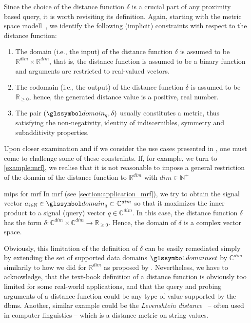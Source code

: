 Since the choice of the distance function $\delta$ is a crucial part of any proximity based query, it is worth revisiting its definition. Again, starting with the metric space modell~\cite{Zezula:2006Similarity}, we identify the following (implicit) constraints with respect to the distance function:

\begin{enumerate}
    \item The domain (i.e., the input) of the distance function $\delta$ is assumed to be $\mathbb{R}^{dim} \times \mathbb{R}^{dim}$, that is, the distance function is assumed to be a binary function and arguments are restricted to real-valued vectors.
    \item The codomain (i.e., the output) of the distance function $\delta$ is assumed to be $\mathbb{R}_{\geq 0}$, hence, the generated distance value is a positive, real number.
    \item The pair $(\domain_q,\delta)$ usually constitutes a metric, thus satisfying the non-negativity, identity of indiscernibles, symmetry and subadditivity properties.
\end{enumerate}

Upon closer examination and if we consider the use cases presented in , one must come to challenge some of these constraints. If, for example, we turn to \cref{example:mrf}, we realise that it is not reasonable to impose a general restriction of the domain of the distance function to $\mathbb{R}^{dim}$ with $dim \in \mathbb{N^{+}}$

\begin{example}[label=example:mrf]{\acrlong{mips}{} for \acrshort{mrf}}{}
    In \acrshort{mrf} (see \cref{section:application_mrf}), we try to obtain the signal vector $a_{i \in \mathbb{N}} \in \domain_q \subset \mathbb{C}^{dim}$ so that it maximizes the inner product to a signal (query) vector $q \in \mathbb{C}^{dim}$. In this case, the distance function $\delta$ has the form $\delta \colon \mathbb{C}^{dim} \times \mathbb{C}^{dim} \to \mathbb{R}_{\geq 0}$. Hence, the domain of $\delta$ is a complex vector space.
\end{example}

Obviously, this limitation of the definition of $\delta$ can be easily remediated simply by extending the set of supported data domains $\domainset$ by $\mathbb{C}^{dim}$ similarily to how we did for $\mathbb{R}^{dim}$ as proposed by \cite{Giangreco:2018Database}. Nevertheless, we have to acknowledge, that the text-book definition of a distance function is obviously too limited for some real-world applications, and that the query and probing arguments of a distance function could be any type of value supported by the \acrshort{dbms}. Another, similar example could be the \emph{Levenshtein distance}~\cite{Levensthtein:1965Binary} -- often used in computer linguistics -- which is a distance metric on string values.

